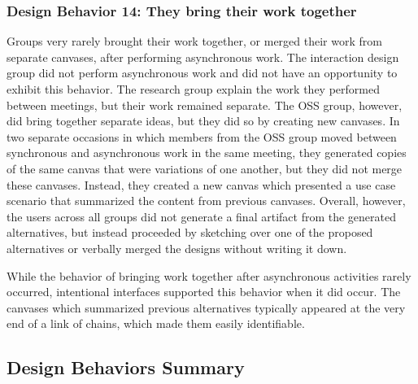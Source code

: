 \subsubsection{Design Behavior 14: They bring their work together}

Groups very rarely brought their work together, or merged their work from separate canvases, after performing asynchronous work. The interaction design group did not perform asynchronous work and did not have an opportunity to exhibit this behavior. The research group explain the work they performed between meetings, but their work remained separate. The OSS group, however, did bring together separate ideas, but they did so by creating new canvases. In two separate occasions in which members from the OSS group moved between synchronous and asynchronous work in the same meeting, they generated copies of the same canvas that were variations of one another, but they did not merge these canvases. Instead, they created a new canvas which presented a use case scenario that summarized the content from previous canvases. Overall, however, the users across all groups did not generate a final artifact from the generated alternatives, but instead proceeded by sketching over one of the proposed alternatives or verbally merged the designs without writing it down.

While the behavior of bringing work together after asynchronous activities rarely occurred, intentional interfaces supported this behavior when it did occur. The canvases which summarized previous alternatives typically appeared at the very end of a link of chains, which made them easily identifiable.


\subsection{Design Behaviors Summary}

